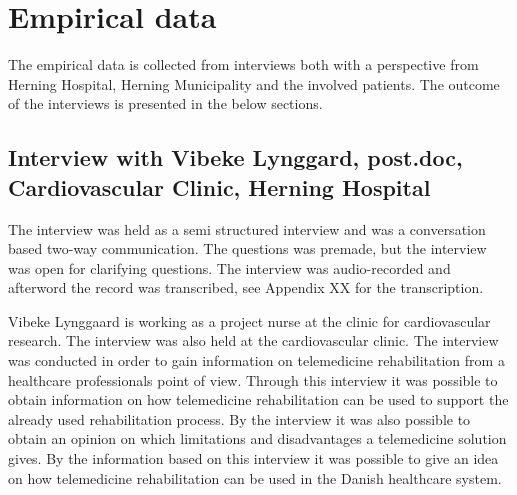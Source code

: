 \chapter{Empirical data}
\label{empirical}

The empirical data is collected from interviews both with a perspective from Herning Hospital, Herning Municipality and the involved patients. The outcome of the interviews is presented in the below sections.  

\section{Interview with Vibeke Lynggard, post.doc, Cardiovascular Clinic, Herning Hospital}
The interview was held as a semi structured interview and was a conversation based two-way communication. The questions was premade, but the interview was open for clarifying questions. The interview was audio-recorded and afterword the record was transcribed, see Appendix XX for the transcription.    

Vibeke Lynggaard is working as a project nurse at the clinic for cardiovascular research. The interview was also held at the cardiovascular clinic. The interview was conducted in order to gain information on telemedicine rehabilitation from a healthcare professionals point of view. Through this interview it was possible to obtain information on how telemedicine rehabilitation can be used to support the already used rehabilitation process. By the interview it was also possible to obtain an opinion on which limitations and disadvantages a telemedicine solution gives. By the information based on this interview it was possible to give an idea on how telemedicine rehabilitation can be used in the Danish healthcare system. 

